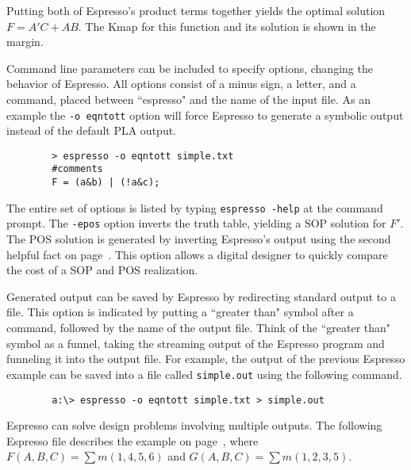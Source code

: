 \begin{changemargin}{1.5cm}{1.5cm}
Putting both of Espresso's product terms together yields the
optimal solution $F=A'C+AB$.  The Kmap for this function and
its \SOPmin solution is shown in the margin.


Command line parameters can be included to specify options,
changing the behavior of Espresso.
All options consist of a minus sign, a letter, and a command,
placed between ``espresso" and the name of the input file. As an
example the \verb+-o eqntott+ option will force Espresso to generate a
symbolic output instead of the default PLA output.
\end{changemargin}

\begin{verbatim}
        > espresso -o eqntott simple.txt
        #comments
        F = (a&b) | (!a&c);
\end{verbatim}

The entire set of options is listed by typing
\verb+espresso -help+ at the command prompt. The \verb+-epos+ option
inverts the truth table, yielding a SOP solution for
$F'$.  The POS solution is generated by inverting Espresso's
output using the second helpful fact on page~\pageref{page:second}.
This option allows a digital designer to quickly compare the
cost of a SOP and POS realization.

Generated output can be saved by Espresso by redirecting standard
output to a file.  This option is indicated by putting a ``greater than" symbol after a
command, followed by the name of the output file.
Think of the ``greater than" symbol as a funnel, taking
the streaming output of the Espresso program and funneling it into
the output file.  For example, the output of the previous Espresso example can
be saved into a file called \verb+simple.out+ using the following command.

\begin{verbatim}
        a:\> espresso -o eqntott simple.txt > simple.out
\end{verbatim}

Espresso can solve design problems involving multiple outputs. The
following Espresso file describes the example on
page~\pageref{page:DualFnc}, where
$F(A,B,C) = \sum m(1,4,5,6)$ and $G(A,B,C) = \sum m(1,2,3,5)$.

